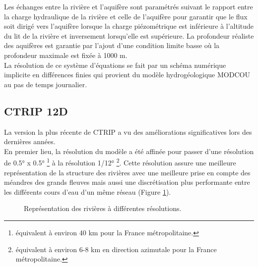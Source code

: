 \noindent Les échanges entre la rivière et l'aquifère sont paramétrés suivant le rapport entre la charge hydraulique de la rivière et celle de l'aquifère pour garantir que le flux soit dirigé vers l'aquifère lorsque la charge piézométrique est inférieure à l'altitude du lit de la rivière et inversement lorsqu'elle est supérieure. La profondeur réaliste des aquifères est garantie par l'ajout d'une condition limite basse où la profondeur maximale est fixée à 1000 m.\\
La résolution de ce système d'équations se fait par un schéma numérique implicite en différences finies qui provient du modèle hydrogéologique MODCOU \citet{ledoux1989} au pas de temps journalier.

\subsection{\selectfont CTRIP 12D}
\label{subsec:CTRIP_12D}

\noindent La version la plus récente de CTRIP a vu des améliorations significatives lors des dernières années.\\
En premier lieu, la résolution du modèle a été affinée pour passer d'une résolution de 0.5° x 0.5° \footnote{équivalent à environ 40 km pour la France métropolitaine.} à la résolution 1/12° \footnote{équivalent à environ 6-8 km en direction azimutale pour la France métropolitaine.}. Cette résolution assure une meilleure représentation de la structure des rivières avec une meilleure prise en compte des méandres des grands fleuves mais aussi une discrétisation plus performante entre les différents cours d'eau d'un même réseau (Figure \ref{ctrip_france}).

\begin{figure}[!h]
     \hfill
     \hfill
     \caption{Représentation des rivières à différentes résolutions.}
     \label{ctrip_france}
\end{figure}

